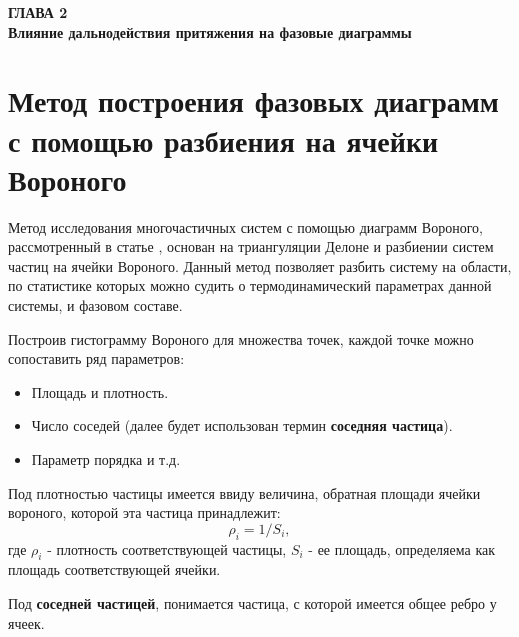 
\newpage
\begin{center}
\textbf{\large ГЛАВА 2 \\ Влияние дальнодействия притяжения на фазовые диаграммы}
\end{center}



\section{Метод построения фазовых диаграмм с помощью разбиения на ячейки Вороного}\label{C2_1}

Метод исследования многочастичных систем с помощью диаграмм Вороного, рассмотренный в статье \cite{Ovcharov2017}, основан на триангуляции Делоне и разбиении систем частиц на ячейки Вороного. Данный метод позволяет разбить систему на области, по статистике которых можно судить о термодинамический параметрах данной системы, и фазовом составе.

Построив гистограмму Вороного для множества точек, каждой точке можно сопоставить ряд параметров:
\begin{itemize}
\item Площадь и плотность.
\item Число соседей (далее будет использован термин \textbf{соседняя частица}).
\item Параметр порядка и т.д.
\end{itemize}

Под плотностью частицы имеется ввиду величина, обратная площади ячейки вороного, которой эта частица принадлежит:
\begin{equation}
\rho_i = 1 / S_i,
\label{eqRho}
\end{equation}
где $\rho_i$ - плотность соответствующей частицы, $S_i$ - ее площадь, определяема как площадь соответствующей ячейки.

Под \textbf{соседней частицей}, понимается частица, с которой имеется общее ребро у ячеек.

